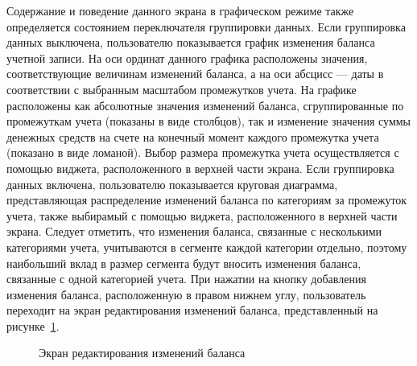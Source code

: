 Содержание и поведение данного экрана в графическом режиме также
определяется состоянием переключателя группировки данных.
Если группировка данных выключена,
пользователю показывается график изменения баланса учетной записи.
На оси ординат данного графика расположены значения,
соответствующие величинам изменений баланса, а на оси абсцисс ---
даты в соответствии с выбранным масштабом промежутков учета.
На графике расположены как абсолютные значения изменений баланса,
сгруппированные по промежуткам учета (показаны в виде столбцов),
так и изменение значения суммы денежных средств на счете
на конечный момент каждого промежутка учета (показано в виде ломаной).
Выбор размера промежутка учета осуществляется с помощью виджета,
расположенного в верхней части экрана.
Если группировка данных включена, пользователю показывается
круговая диаграмма, представляющая распределение изменений баланса
по категориям за промежуток учета, также выбирамый с помощью виджета,
расположенного в верхней части экрана.
Следует отметить, что изменения баланса, связанные с несколькими
категориями учета, учитываются в сегменте каждой категории отдельно,
поэтому наибольший вклад в размер сегмента будут вносить изменения
баланса, связанные с одной категорией учета.
При нажатии на кнопку добавления изменения баланса,
расположенную в правом нижнем углу,
пользователь переходит на экран редактирования изменений баланса,
представленный на рисунке~\ref{fig:implementation_ui_activity_input}.

\begin{figure}[h!]
  \centering
  \caption{Экран редактирования изменений баланса}
  \label{fig:implementation_ui_activity_input}
\end{figure}

